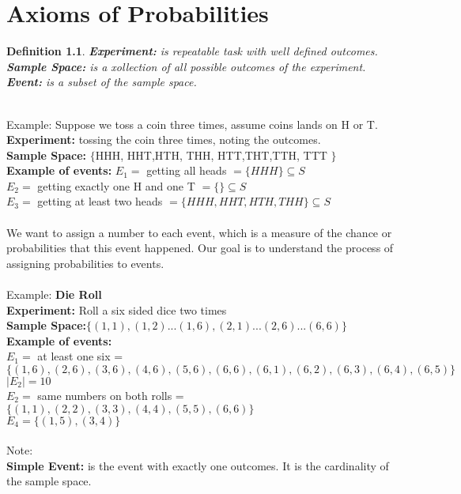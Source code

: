 \documentclass[11pt,oneside]{book}
\theoremstyle{break}
\theoremstyle{break}
\newtheorem{defn}{Definition}[corL]
\newcommand{\note}{\color{red}Note: \color{black}}
\newcommand{\example}{\color{green}Example: \color{black}}
\begin{document}
	\chapter[Axioms of Probabilities]{Axioms of Probabilities}
	\begin{defn}
	\textbf{Experiment:} is repeatable task with well defined outcomes.\\
	\textbf{Sample Space:} is a xollection of all possible outcomes of the experiment.\\
	\textbf{Event:} is a subset of the sample space.
	\end{defn}
	\hfill\\
	\example Suppose we toss a coin three times, assume coins lands on H or T.\\
	\textbf{Experiment: }tossing the coin three times, noting the outcomes.\\
	\textbf{Sample Space:} $\{$HHH, HHT,HTH, THH, HTT,THT,TTH, TTT $\}$\\
	\textbf{Example of events:} $E_1=$ getting all heads $=\{HHH\}\subseteq S$\\ 
	$E_2=$ getting exactly one H and one T $=\{\}\subseteq S$\\
	$E_3=$ getting at least two heads $=\{HHH, HHT, HTH, THH\}\subseteq S$\\
	\hfill\\
	We want to assign a number to each event, which is a measure of the chance or probabilities that this event happened. Our goal is to understand the process of assigning probabilities to events.\\
	\hfill\\
	\example \textbf{Die Roll}\\
	\textbf{Experiment:} Roll a six sided dice two times\\
	\textbf{Sample Space:}$\{(1,1),(1,2)...(1,6),(2,1)...(2,6)...(6,6)\}$\\
	\textbf{Example of events:} \\
	$E_1=$ at least one six = $\{(1,6),(2,6),(3,6),(4,6),(5,6),(6,6),(6,1),(6,2),(6,3),(6,4),(6,5)\}$\\
	$|E_2|=10$\\
	$E_2=$ same numbers on both rolls = $\{(1,1),(2,2),(3,3),(4,4),(5,5),(6,6)\}$\\
	$E_4=\{(1,5),(3,4)\}$\\
	\hfill\\
	\note\\ 
	\textbf{Simple Event:} is the event with exactly one outcomes. It is the cardinality of the sample space. \\
\end{document}
